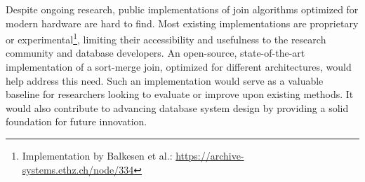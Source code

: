Despite ongoing research, public implementations of join algorithms optimized for modern hardware
are hard to find. Most existing implementations are proprietary or 
experimental\footnote{Implementation by Balkesen et al.: \url{https://archive-systems.ethz.ch/node/334}}, limiting their
accessibility and usefulness to the research community and database developers. 
An open-source, state-of-the-art implementation of a sort-merge join, optimized for different
architectures, would help address this need. Such an implementation would serve as a valuable
baseline for researchers looking to evaluate or improve upon existing methods. It would also
contribute to advancing database system design by providing a solid foundation for future innovation.

